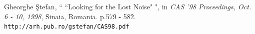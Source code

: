 {\begin{thebibliography}{}



  Gheorghe \c Stefan,  `` ``Looking for the Lost Noise" ", in {\em CAS '98 Proceedings, Oct. 6 - 10, 1998}, Sinaia, Romania. p.579 - 582. \\ {\tt http://arh.pub.ro/gstefan/CAS98.pdf}







\end{thebibliography}}
